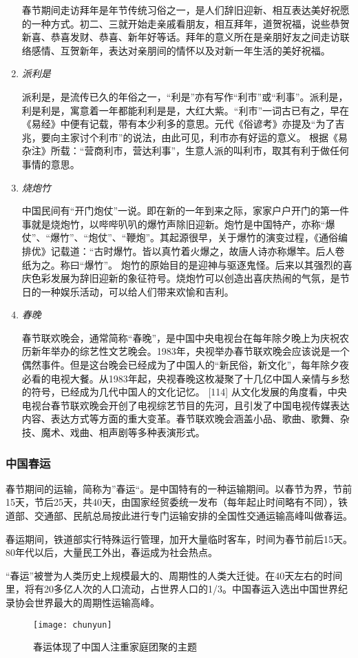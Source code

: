 \begin{enumerate}
春节期间走访拜年是年节传统习俗之一，是人们辞旧迎新、相互表达美好祝愿的一种方式。初二、三就开始走亲戚看朋友，相互拜年，道贺祝福，说些恭贺新喜、恭喜发财、恭喜、新年好等话。拜年的意义所在是亲朋好友之间走访联络感情、互贺新年，表达对亲朋间的情怀以及对新一年生活的美好祝福。

\item \emph{派利是}

派利是，是流传已久的年俗之一，“利是”亦有写作“利市”或“利事”。派利是，利是利是，寓意着一年都能利利是是，大红大紫。“利市”一词古已有之，早在《易经》中便有记载，带有本少利多的意思。元代《俗谚考》亦提及“为了吉兆，要向主家讨个利市”的说法，由此可见，利市亦有好运的意义。 根据《易杂注》所载：“营商利市，营达利事”，生意人派的叫利市，取其有利于做任何事情的意思。

\item \emph{烧炮竹}

中国民间有“开门炮仗”一说。即在新的一年到来之际，家家户户开门的第一件事就是烧炮竹，以哔哔叭叭的爆竹声除旧迎新。炮竹是中国特产，亦称“爆仗”、“爆竹”、“炮仗”、“鞭炮”。其起源很早，关于爆竹的演变过程，《通俗编排优》记载道：“古时爆竹。皆以真竹着火爆之，故唐人诗亦称爆竿。后人卷纸为之。称曰“爆竹”。
炮竹的原始目的是迎神与驱逐鬼怪。后来以其强烈的喜庆色彩发展为辞旧迎新的象征符号。烧炮竹可以创造出喜庆热闹的气氛，是节日的一种娱乐活动，可以给人们带来欢愉和吉利。

\item \emph{春晚}

春节联欢晚会，通常简称“春晚”，是中国中央电视台在每年除夕晚上为庆祝农历新年举办的综艺性文艺晚会。1983年，央视举办春节联欢晚会应该说是一个偶然事件。但是这台晚会已经成为了中国人的“新民俗，新文化”，每年除夕夜必看的电视大餐。从1983年起，央视春晚这枚凝聚了十几亿中国人亲情与乡愁的符号，已经成为几代中国人的文化记忆。 [114] 
从文化发展的角度看，中央电视台春节联欢晚会开创了电视综艺节目的先河，且引发了中国电视传媒表达内容、表达方式等方面的重大变革。春节联欢晚会涵盖小品、歌曲、歌舞、杂技、魔术、戏曲、相声剧等多种表演形式。

\end{enumerate}

\subsubsection{中国春运}
\par
春节期间的运输，简称为”春运“。是中国特有的一种运输期间。以春节为界，节前15天，节后25天，共40天，由国家经贸委统一发布（每年起止时间略有不同），铁道部、交通部、民航总局按此进行专门运输安排的全国性交通运输高峰叫做春运。
\par
春运期间，铁道部实行特殊运行管理，加开大量临时客车，时间为春节前后15天。80年代以后，大量民工外出，春运成为社会热点。
\par
“春运”被誉为人类历史上规模最大的、周期性的人类大迁徙。在40天左右的时间里，将有20多亿人次的人口流动，占世界人口的1/3。中国春运入选出中国世界纪录协会世界最大的周期性运输高峰。
\begin{figure}
    \centering
    \texttt{[image: chunyun]}
    \caption{春运体现了中国人注重家庭团聚的主题}
\end{figure}

